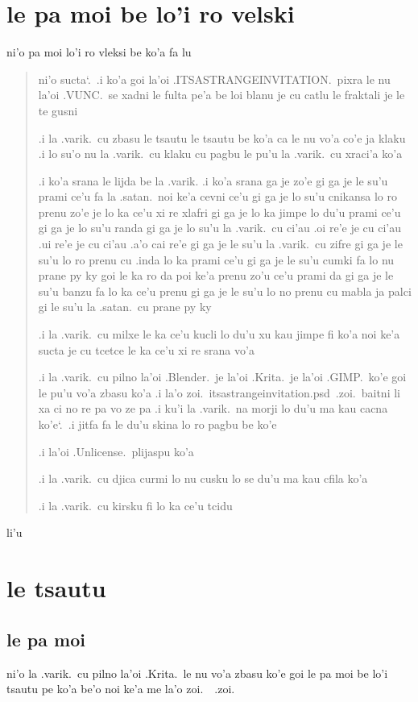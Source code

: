 \documentclass{report}
\newcommand\sds{\spacefactor\sfcode`.\ \space}
\begin{document}
\section{le pa moi be lo'i ro velski}
ni'o pa moi lo'i ro vleksi be ko'a fa lu

\begin{quote}
ni'o sucta\sds  .i ko'a goi la'oi .ITSASTRANGEINVITATION.\ pixra le nu la'oi .VUNC.\ se xadni le fulta pe'a be loi blanu je cu catlu le fraktali je le te gusni

.i la .varik.\ cu zbasu le tsautu le tsautu be ko'a ca le nu vo'a co'e ja klaku
.i lo su'o nu la .varik.\ cu klaku cu pagbu le pu'u la .varik.\ cu xraci'a ko'a

.i ko'a srana le lijda be la .varik.
.i ko'a srana ga je zo'e gi ga je le su'u prami ce'u fa la .satan.\ noi ke'a cevni ce'u gi ga je lo su'u cnikansa lo ro prenu zo'e je lo ka ce'u xi re xlafri gi ga je lo ka jimpe lo du'u prami ce'u gi ga je lo su'u randa gi ga je lo su'u la .varik.\ cu ci'au .oi re'e je cu ci'au .ui re'e je cu ci'au .a'o cai re'e gi ga je le su'u la .varik.\ cu zifre gi ga je le su'u lo ro prenu cu .inda lo ka prami ce'u gi ga je le su'u cumki fa lo nu prane py ky goi le ka ro da poi ke'a prenu zo'u ce'u prami da gi ga je le su'u banzu fa lo ka ce'u prenu gi ga je le su'u lo no prenu cu mabla ja palci gi le su'u la .satan.\ cu prane py ky

.i la .varik.\ cu milxe le ka ce'u kucli lo du'u xu kau jimpe fi ko'a noi ke'a sucta je cu tcetce le ka ce'u xi re srana vo'a

.i la .varik.\ cu pilno la'oi .Blender.\ je la'oi .Krita.\ je la'oi .GIMP.\ ko'e goi le pu'u vo'a zbasu ko'a
.i la'o zoi.\ itsastrangeinvitation.psd\ .zoi.\ baitni li xa ci no re pa vo ze pa
.i ku'i la .varik.\ na morji lo du'u ma kau cacna ko'e\sds  .i jitfa fa le du'u skina lo ro pagbu be ko'e

.i la'oi .Unlicense.\ plijaspu ko'a

.i la .varik.\ cu djica curmi lo nu cusku lo se du'u ma kau cfila ko'a

.i la .varik.\ cu kirsku fi lo ka ce'u tcidu
\end{quote}

li'u

\section{le tsautu}

\subsection{le pa moi}
ni'o la .varik.\ cu pilno la'oi .Krita.\ le nu vo'a zbasu ko'e goi le pa moi be lo'i tsautu pe ko'a be'o noi ke'a me la'o zoi.\ \ .zoi.
\end{document}
